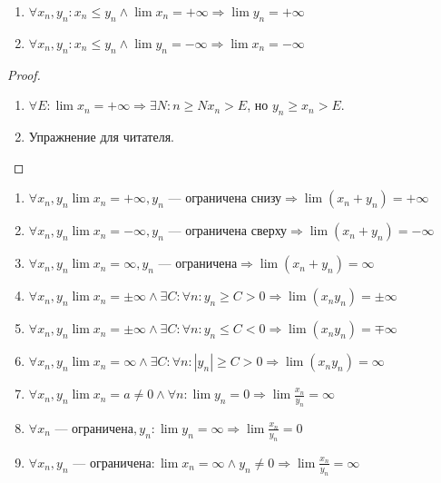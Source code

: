 \begin{theorem}
    \slashn
    \begin{enumerate}
        \item $\forall x_n, y_n: x_n \le y_n \land \lim x_n = +\infty \Rightarrow \lim y_n = +\infty$
        \item $\forall x_n, y_n: x_n \le y_n \land \lim y_n = -\infty \Rightarrow \lim x_n = -\infty$
    \end{enumerate}
\end{theorem}
\begin{proof}
    \slashn
    \begin{enumerate}
        \item $\forall E: \lim x_n = +\infty \Rightarrow \exists N : n \ge N x_n > E$, но $y_n \ge x_n > E$.
        \item Упражнение для читателя.
    \end{enumerate}
\end{proof}
\begin{theorem}
    \slashn
    \begin{enumerate}
        \item $\forall x_n, y_n \lim x_n = +\infty, y_n\text{ --- ограничена снизу} \Rightarrow \lim(x_n+y_n)=+\infty$
        \item $\forall x_n, y_n \lim x_n = -\infty, y_n\text{ --- ограничена сверху} \Rightarrow \lim(x_n+y_n)=-\infty$
        \item $\forall x_n, y_n \lim x_n = \infty, y_n\text{ --- ограничена} \Rightarrow \lim(x_n+y_n)=\infty$
        \item $\forall x_n, y_n \lim x_n = \pm\infty \land \exists C: \forall n: y_n \ge C > 0  \Rightarrow \lim(x_ny_n)=\pm\infty$
        \item $\forall x_n, y_n \lim x_n = \pm\infty \land \exists C: \forall n: y_n \le C < 0  \Rightarrow \lim(x_ny_n)=\mp\infty$
        \item $\forall x_n, y_n \lim x_n = \infty \land \exists C: \forall n: |y_n| \ge C > 0  \Rightarrow \lim(x_ny_n)=\infty$
        \item $\forall x_n, y_n \lim x_n = a \neq 0 \land \forall n: \lim y_n = 0  \Rightarrow \lim \frac{x_n}{y_n}=\infty$
        \item $\forall x_n\text{ --- ограничена}, y_n: \lim y_n = \infty \Rightarrow \lim \frac{x_n}{y_n} = 0$
        \item $\forall x_n, y_n\text{ --- ограничена}: \lim x_n = \infty \land y_n \neq 0 \Rightarrow \lim \frac{x_n}{y_n} = \infty$
    \end{enumerate}
\end{theorem}
